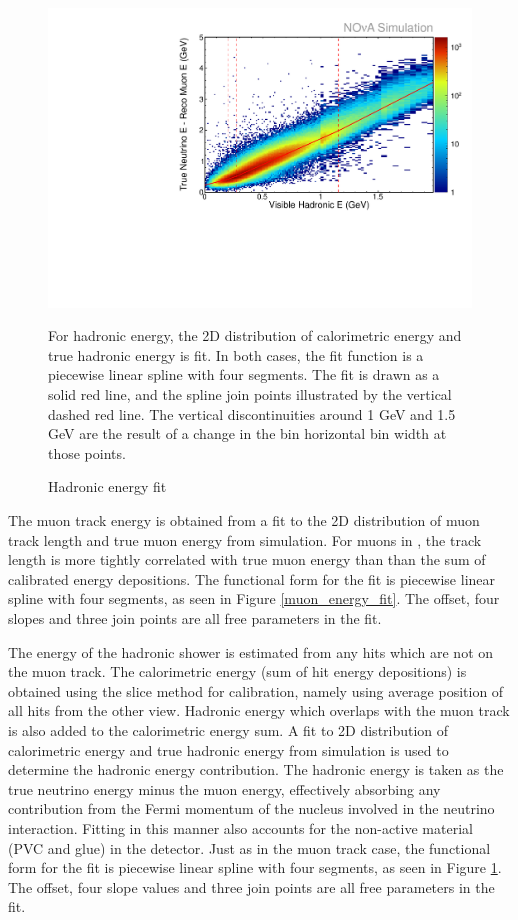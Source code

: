 \begin{figure}
  \includegraphics[width=\textwidth]{figures/plots/reco/numu_energy_had_fit.pdf}
  \caption{Hadronic energy fit}{For hadronic energy, the 2D distribution of calorimetric energy and true
  hadronic energy is fit.  In both cases, the fit function is a piecewise
  linear spline with four segments.  The fit is drawn as a solid red line,
  and the spline join points illustrated by the vertical dashed red line.
  The vertical discontinuities around 1 GeV and 1.5 GeV are the result
  of a change in the bin horizontal bin width at those points.}
  \label{had_energy_fit}
\end{figure}


The muon track energy is obtained from a fit to the 2D distribution
of muon track length and true muon energy from simulation.
For muons in \nova, the track length is more tightly correlated with
true muon energy than than the sum of calibrated energy depositions.
The functional form for the fit is piecewise linear spline with four segments,
as seen in Figure \ref{muon_energy_fit}.
The offset, four slopes and three join points are all free parameters in the
fit.


The energy of the hadronic shower is estimated from any hits which are not on
the muon track.
The calorimetric energy (sum of hit energy depositions) is obtained
using the slice method for calibration, namely using average position of all
hits from the other view.
Hadronic energy which overlaps with the muon track
\cite{sachdev2015thesis} is also added to the calorimetric energy sum.
A fit to 2D distribution of calorimetric energy and true hadronic energy
from simulation is used to determine the hadronic energy contribution.
The hadronic energy is taken as the true neutrino energy minus the muon energy,
effectively absorbing any contribution from the Fermi momentum of the
nucleus involved in the neutrino interaction.
Fitting in this manner also accounts for the non-active material (PVC and glue)
in the detector.
Just as in the muon track case, the functional form for the fit is piecewise
linear spline with four segments,
as seen in Figure \ref{had_energy_fit}.
The offset, four slope values and three join points are all free parameters in
the fit.
